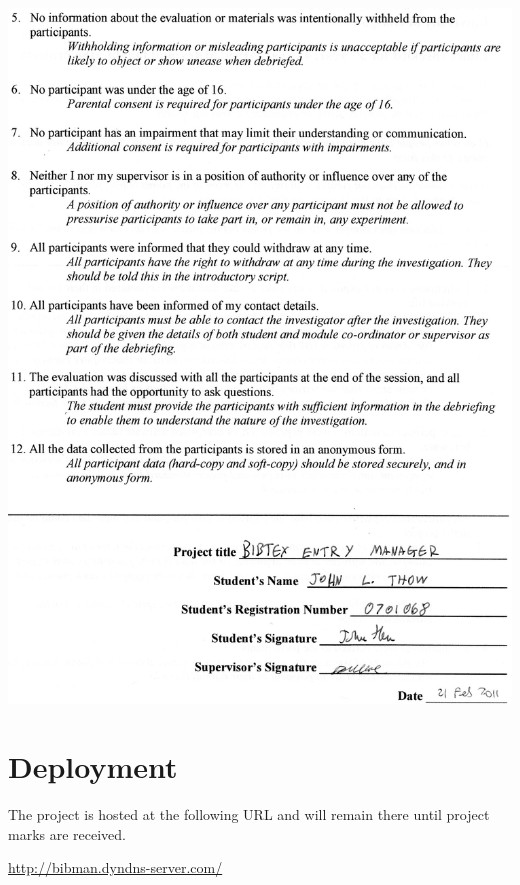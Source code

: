 \documentclass{l4proj}
\begin{document}
\includegraphics{images/EthicsChecklist2.jpg}

\chapter{Deployment}
The project is hosted at the following URL and will remain there until project marks are received.

\url{http://bibman.dyndns-server.com/}
\end{document}
